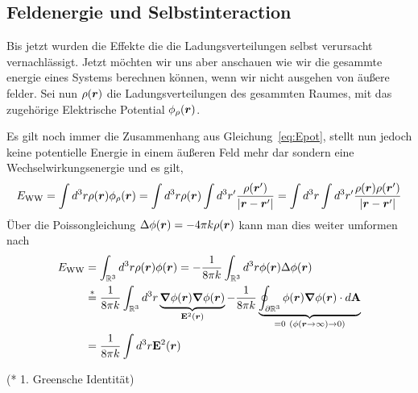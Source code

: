 \subsection{Feldenergie und Selbstinteraction}%
\label{sub:feldenergie}
Bis jetzt wurden die Effekte die die Ladungsverteilungen selbst verursacht
vernachlässigt. Jetzt möchten wir uns aber anschauen wie wir die gesammte
energie eines Systems berechnen können, wenn wir nicht ausgehen von äußere
felder. Sei nun $\rho(\vb*r)$ die Ladungsverteilungen des gesammten Raumes,
mit das zugehörige Elektrische Potential $\phi_\rho(\vb*r)$.

Es gilt noch immer die Zusammenhang aus Gleichung~\ref{eq:Epot}, stellt 
nun jedoch keine potentielle Energie in einem äußeren Feld mehr dar 
sondern eine Wechselwirkungsenergie und es gilt,
\begin{equation}
  E_{\mathrm{WW}}=\int d^3r\rho(\vb*r)\phi_\rho(\vb*r)
  =\int d^3r\rho(\vb*r)\int d^3 r' \frac{\rho(\vb*r')}{\abs{\vb*r-\vb*r'}}
  =\int d^3r\int d^3 r' \frac{\rho(\vb*r)\rho(\vb*r')}{\abs{\vb*r-\vb*r'}}
\end{equation}
Über die Poissongleichung $\Delta\phi(\vb*r)=-4\pi k \rho(\vb*r)$ 
kann man dies weiter umformen nach
\begin{equation}
   \begin{split}
      E_{\mathrm{WW}}
      &=\int_{\mathbb{R}^3} d^3r\rho(\vb*r)\phi(\vb*r)
      =-\frac{1}{8\pi k} \int_{\mathbb{R}^3} 
      d^3r\phi(\vb*r)\Delta\phi(\vb*r) \\
      &\stackrel*= 
      \frac{1}{8\pi k} \int_{\mathbb{R}^3} d^3r
      \underbrace{\grad\phi(\vb*r)\grad\phi(\vb*r)}_{\vb E^2(\vb*r)}
      -\frac{1}{8\pi k}\underbrace{\oint_{\partial\mathbb{R}^3}
        \phi(\vb*r)\grad\phi(\vb*r) \cdot d\vb A}_{=0\ (\phi(\vb*r\to\infty)\to0)} \\
      &=\frac{1}{8\pi k} \int d^3r \vb E^2(\vb*r) 
   \end{split}
\end{equation}
\begin{center}
  (* 1. Greensche Identität)
\end{center}
